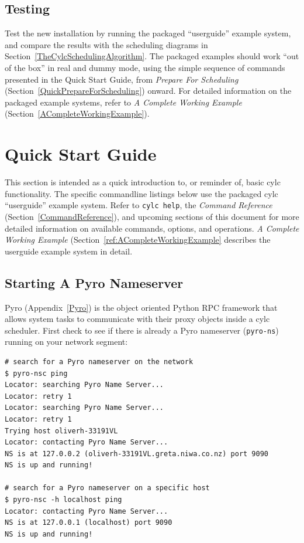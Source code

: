 \documentclass[11pt,a4paper]{article}
\begin{document}
\subsection{Testing} 
\label{Testing}

Test the new installation by running the packaged ``userguide'' example
system, and compare the results with the scheduling diagrams in
Section~\ref{TheCylcSchedulingAlgorithm}. The packaged examples should
work ``out of the box'' in real and dummy mode, using the simple
sequence of commands presented in the Quick Start Guide, from {\em
Prepare For Scheduling} (Section~\ref{QuickPrepareForScheduling})
onward.  For detailed information on the packaged example systems, refer
to {\em A Complete Working Example}
(Section~\ref{ACompleteWorkingExample}).  

\pagebreak
\section{Quick Start Guide} 
\label{QuickStartGuide}

\lstset{language=bash}

This section is intended as a quick introduction to, or reminder of,
basic cylc functionality. The specific commandline listings below use
the packaged cylc ``userguide'' example system. Refer to 
\lstinline=cylc help=, the {\em Command Reference}
(Section~\ref{CommandReference}), and
upcoming sections of this document for more detailed information on
available commands, options, and operations.  {\em A Complete Working
Example} (Section~\ref{ref:ACompleteWorkingExample} describes the
userguide example system in detail.

\subsection{Starting A Pyro Nameserver}
\label{QuickStartingAPyroNameserver}

Pyro (Appendix~\ref{Pyro}) is the object oriented Python RPC framework
that allows system tasks to communicate with their proxy objects inside
a cylc scheduler. First check to see if there is already a Pyro
nameserver (\lstinline=pyro-ns=) running on your network segment:

\begin{lstlisting}
# search for a Pyro nameserver on the network
$ pyro-nsc ping
Locator: searching Pyro Name Server...
Locator: retry 1
Locator: searching Pyro Name Server...
Locator: retry 1
Trying host oliverh-33191VL
Locator: contacting Pyro Name Server...
NS is at 127.0.0.2 (oliverh-33191VL.greta.niwa.co.nz) port 9090
NS is up and running!

# search for a Pyro nameserver on a specific host
$ pyro-nsc -h localhost ping
Locator: contacting Pyro Name Server...
NS is at 127.0.0.1 (localhost) port 9090
NS is up and running!
\end{lstlisting}
\end{document}
